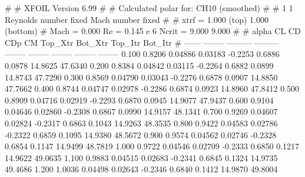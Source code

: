 #  
#       XFOIL         Version 6.99
#  
# Calculated polar for: CH10 (smoothed)                                 
#  
# 1 1 Reynolds number fixed          Mach number fixed         
#  
# xtrf =   1.000 (top)        1.000 (bottom)  
# Mach =   0.000     Re =     0.145 e 6     Ncrit =   9.000  9.000
#  
#   alpha    CL        CD       CDp       CM     Top_Xtr  Bot_Xtr  Top_Itr  Bot_Itr
#  ------ -------- --------- --------- -------- -------- -------- -------- --------
   0.100   0.8206   0.04886   0.03183  -0.2253   0.6886   0.0878  14.8625  47.6340
   0.200   0.8384   0.04842   0.03115  -0.2264   0.6882   0.0899  14.8743  47.7290
   0.300   0.8569   0.04790   0.03043  -0.2276   0.6878   0.0907  14.8850  47.7662
   0.400   0.8744   0.04747   0.02978  -0.2286   0.6874   0.0923  14.8960  47.8412
   0.500   0.8909   0.04716   0.02919  -0.2293   0.6870   0.0945  14.9077  47.9437
   0.600   0.9104   0.04646   0.02860  -0.2308   0.6867   0.0990  14.9157  48.1341
   0.700   0.9269   0.04607   0.02824  -0.2317   0.6863   0.1043  14.9263  48.3535
   0.800   0.9422   0.04583   0.02786  -0.2322   0.6859   0.1095  14.9380  48.5672
   0.900   0.9574   0.04562   0.02746  -0.2328   0.6854   0.1147  14.9499  48.7819
   1.000   0.9722   0.04546   0.02709  -0.2333   0.6850   0.1217  14.9622  49.0635
   1.100   0.9883   0.04515   0.02683  -0.2341   0.6845   0.1324  14.9735  49.4686
   1.200   1.0036   0.04498   0.02643  -0.2346   0.6840   0.1412  14.9870  49.8004
